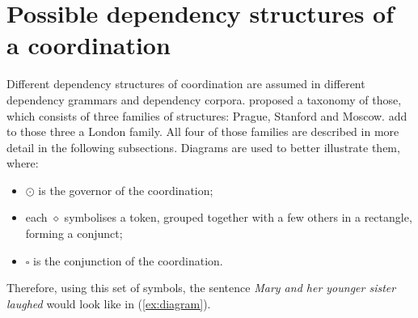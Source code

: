 \section{Possible dependency structures of a coordination}\label{sec:coord annotations}

Different dependency structures of coordination are assumed in different dependency grammars and dependency corpora. \cite{popel2013coordination} proposed a taxonomy of those, which consists of three families of structures: Prague, Stanford and Moscow. \cite{prz:woz:23} add to those three a London family. All four of those families are described in more detail in the following subsections. Diagrams are used to better illustrate them, where:
\begin{itemize}
    \item $\odot$ is the governor of the coordination;
    \item each $\diamond$ symbolises a token, grouped together with a few others in a rectangle, forming a conjunct;
    \item $\square$ is the conjunction of the coordination.
\end{itemize}

Therefore, using this set of symbols, the sentence \textsl{Mary and her younger sister laughed} would look like in (\ref{ex:diagram}).


\begin{exe}
    \ex\label{ex:diagram}
\end{exe}

